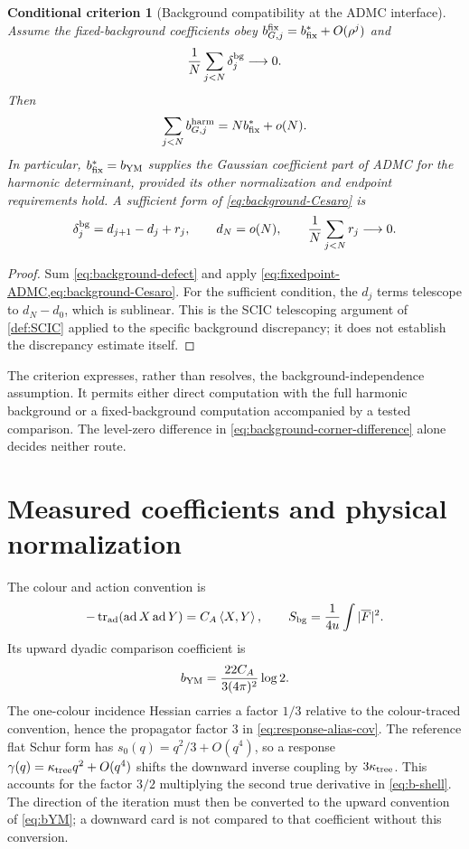\documentclass[11pt,oneside,openany]{book}
\newtheorem{criterion}[criterion]{Conditional criterion}
\theoremstyle{definition}
\theoremstyle{remark}
\newcommand{\tr}{\operatorname{tr}}
\newcommand{\ip}[2]{\left\langle#1,#2\right\rangle}
\begin{document}
\begin{criterion}[Background compatibility at the ADMC interface]
\label{crit:background-ADMC}
Assume the fixed-background coefficients obey
$b_{G,j}^{\rm fix}=b_{\rm fix}^*+O(\rho^j)$ and
\begin{equation}\label{eq:background-Cesaro}
\frac1N\sum_{j<N}\delta_j^{\rm bg}\longrightarrow0.
\end{equation}
Then
\[
\sum_{j<N}b_{G,j}^{\rm harm}=Nb_{\rm fix}^*+o(N).
\]
In particular, $b_{\rm fix}^*=b_{\rm YM}$ supplies the Gaussian
coefficient part of ADMC for the harmonic determinant, provided its other
normalization and endpoint requirements hold. A sufficient form of
\cref{eq:background-Cesaro} is
\begin{equation}\label{eq:background-coboundary}
\delta_j^{\rm bg}=d_{j+1}-d_j+r_j,\qquad
d_N=o(N),\qquad \frac1N\sum_{j<N}r_j\longrightarrow0.
\end{equation}
\end{criterion}
\begin{proof}
Sum \cref{eq:background-defect} and apply
\cref{eq:fixedpoint-ADMC,eq:background-Cesaro}. For the sufficient
condition, the $d_j$ terms telescope to $d_N-d_0$, which is sublinear.
This is the SCIC telescoping argument of \cref{def:SCIC} applied to the
specific background discrepancy; it does not establish the discrepancy
estimate itself.
\end{proof}

The criterion expresses, rather than resolves, the background-independence
assumption. It permits either direct computation with the full harmonic
background or a fixed-background computation accompanied by a tested
comparison. The level-zero difference in
\cref{eq:background-corner-difference} alone decides neither route.

\section{Measured coefficients and physical normalization}
The colour and action convention is
\[
-\tr_{\rm ad}(\operatorname{ad}X\operatorname{ad}Y)=C_A\ip{X}{Y},
\qquad S_{\rm bg}=\frac1{4u}\int|\overline F|^2.
\]
Its upward dyadic comparison coefficient is
\begin{equation}\label{eq:bYM}
b_{\rm YM}=\frac{22C_A}{3(4\pi)^2}\log2.
\end{equation}
The one-colour incidence Hessian carries a factor $1/3$ relative to the
colour-traced convention, hence the propagator factor $3$ in
\cref{eq:response-alias-cov}. The reference flat Schur form has
$s_0(q)=q^2/3+O(q^4)$, so a response
$\gamma(q)=\kappa_{\rm tree}q^2+O(q^4)$ shifts the downward inverse
coupling by $3\kappa_{\rm tree}$. This accounts for the factor $3/2$
multiplying the second true derivative in \cref{eq:b-shell}. The direction
of the iteration must then be converted to the upward convention of
\cref{eq:bYM}; a downward card is not compared to that coefficient without
this conversion.
\end{document}
